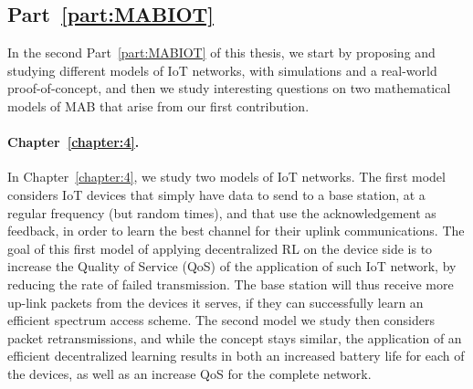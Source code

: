 \subsection{Part~\ref{part:MABIOT}}

In the second Part~\ref{part:MABIOT} of this thesis, we start by proposing and studying different models of IoT networks, with simulations and a real-world proof-of-concept, and then we study interesting questions on two mathematical models of MAB that arise from our first contribution.


\paragraph{Chapter~\ref{chapter:4}.}
%
In Chapter~\ref{chapter:4}, we study two models of IoT networks.
The first model considers IoT devices that simply have data to send to a base station, at a regular frequency (but random times), and that use the acknowledgement as feedback, in order to learn the best channel for their uplink communications.
The goal of this first model of applying decentralized RL on the device side is to increase the Quality of Service (QoS) of the application of such IoT network, by reducing the rate of failed transmission. The base station will thus receive more up-link packets from the devices it serves, if they can successfully learn an efficient spectrum access scheme.
%
The second model we study then considers packet retransmissions, and while the concept stays similar, the application of an efficient decentralized learning results in both an increased battery life for each of the devices, as well as an increase QoS for the complete network.

